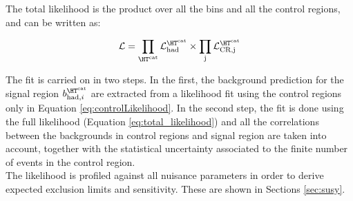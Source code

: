 The total likelihood is the product over all the \htcat bins and all the control regions, and can be written as:

\begin{equation}
\label{eq:total_likelihood}
\mathcal{L} = \prod_{\htcat} \mathcal{L}_{\text{had}}^{\htcat} \times \prod_{\text{j}} \mathcal{L}_{\text{CR,j}}^{\htcat}
\end{equation}

The fit is carried on in two steps. 
In the first, the background prediction for the signal region $b^{\htcat}_{\mathrm{had},i}$ are extracted from a likelihood fit 
using the control regions only in Equation \ref{eq:controlLikelihood}. 
In the second step, the fit is done using the full likelihood (Equation \ref{eq:total_likelihood}) and all 
the correlations between the backgrounds in control regions and signal region are taken into account, 
together with the statistical uncertainty associated to the finite number of events in the control region. \\
The likelihood is profiled against all nuisance parameters in order to derive expected exclusion limits and sensitivity. 
These are shown in Sections \ref{sec:susy}. 





